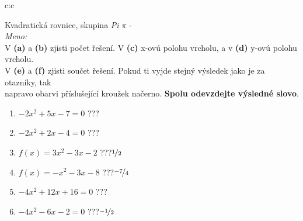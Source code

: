 \documentclass[10pt]{report}
\begin{document}
\clearpage
\thispagestyle{empty}
\begin{tabular}{c:c}
\begin{minipage}[c][99mm][t]{0.49\linewidth}
\begin{center}
\vspace{7mm}
{\huge Kvadratická rovnice, skupina \textit{Pi $\pi$} -}\\[4.5mm]
\textit{Meno:}\phantom{xxxxxxxxxxxxxxxxxxxxxxxxxxxxxxxxxxxxxxxxxxxxxxxxxxxxxxxxxxxxxxxxx}\\[3.5mm]
V \textbf{(a)} a \textbf{(b)} zjisti počet řešení. V \textbf{(c)} x-ovú polohu vrcholu, a v \textbf{(d)} y-ovú polohu vrcholu.\\V \textbf{(e)} a \textbf{(f)} zjisti součet řešení. Pokud ti vyjde stejný výsledek jako je za otazníky, tak\\napravo obarvi příslušející kroužek načerno. \textbf{Spolu odevzdejte výsledné slovo}.\\[3mm]
\begin{minipage}{0.77\linewidth}
\begin{center}
\begin{varwidth}{\textwidth}
\begin{enumerate}
\large
\item $-2x^2+5x-7=0$\quad \dotfill\; ???\;\dotfill {}
\item $-2x^2+2x-4=0$\quad \dotfill\; ???\;\dotfill {}
\item $f(x)=3x^2-3x-2$\quad \dotfill\; ???\;\dotfill \quad $\nicefrac{1}{2}$
\item $f(x)=-x^2-3x-8$\quad \dotfill\; ???\;\dotfill \quad $\nicefrac{-7}{4}$
\item $-4x^2+12x+16=0$\quad \dotfill\; ???\;\dotfill {}
\item $-4x^2-6x-2=0$\quad \dotfill\; ???\;\dotfill \quad $\nicefrac{-1}{2}$
\end{enumerate}
\end{varwidth}
\end{center}
\end{minipage}

\end{center}
\end{minipage}
\end{tabular}
\end{document}
